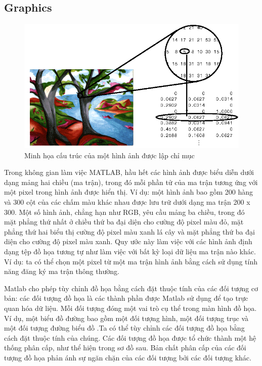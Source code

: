 \documentclass[12pt,a4paper]{report}
\begin{document}
    \subsection{Graphics}
    \begin{figure}[h]
    	\centering
    		\includegraphics[scale=0.6]{resources/imageMatrix.PNG}
    		\caption{Minh họa cấu trúc của một hình ảnh được lập chỉ mục}
    \end{figure}
    	   
    Trong không gian làm việc MATLAB, hầu hết các hình ảnh được biểu diễn dưới dạng mảng hai chiều (ma trận), trong đó mỗi phần tử của ma trận tương ứng với một pixel trong hình ảnh được hiển thị. Ví dụ: một hình ảnh bao gồm 200 hàng và 300 cột của các chấm màu khác nhau được lưu trữ dưới dạng ma trận 200 x 300. Một số hình ảnh, chẳng hạn như RGB, yêu cầu mảng ba chiều, trong đó mặt phẳng thứ nhất ở chiều thứ ba đại diện cho cường độ pixel màu đỏ, mặt phẳng thứ hai biểu thị cường độ pixel màu xanh lá cây và mặt phẳng thứ ba đại diện cho cường độ pixel màu xanh. Quy ước này làm việc với các hình ảnh định dạng tệp đồ họa tương tự như làm việc với bất kỳ loại dữ liệu ma trận nào khác. Ví dụ: ta có thể chọn một pixel từ một ma trận hình ảnh bằng cách sử dụng tính năng đăng ký ma trận thông thường.
    
     Matlab cho phép tùy chỉnh đồ họa bằng cách đặt thuộc tính của các đối tượng cơ bản:
    các đối tượng đồ họa là các thành phần được Matlab sử dụng để tạo trực quan hóa dữ liệu. Mỗi đối tượng đóng một vai trò cụ thể trong màn hình đồ họa. Ví dụ, một biểu đồ đường bao gồm một đối tượng hình, một đối tượng trục và một đối tượng đường biểu đồ .Ta có thể tùy chỉnh các đối tượng đồ họa bằng cách đặt thuộc tính của chúng. Các đối tượng đồ họa được tổ chức thành một hệ thống phân cấp, như thể hiện trong sơ đồ sau. Bản chất phân cấp của các đối tượng đồ họa phản ánh sự ngăn chặn của các đối tượng bởi các đối tượng khác.
    	
\end{document}
